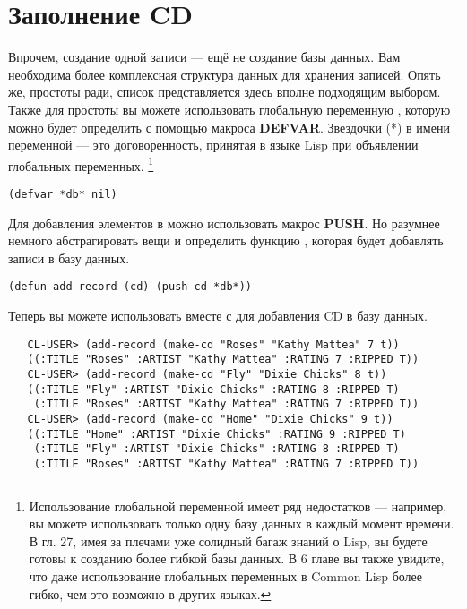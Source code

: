 \section{Заполнение CD}

Впрочем, создание одной записи --- ещё не создание базы данных. Вам необходима более
комплексная структура данных для хранения записей. Опять же, простоты ради, список
представляется здесь вполне подходящим выбором. Также для простоты вы можете использовать
глобальную переменную , которую можно будет определить с помощью макроса
\textbf{DEFVAR}. Звездочки (*) в имени переменной --- это договоренность, принятая в языке
Lisp при объявлении глобальных переменных. \footnote{Использование глобальной переменной
  имеет ряд недостатков --- например, вы можете использовать только одну базу данных в
  каждый момент времени. В гл. 27, имея за плечами уже солидный багаж знаний о Lisp, вы
  будете готовы к созданию более гибкой базы данных. В 6 главе вы также увидите, что даже
  использование глобальных переменных в Common Lisp более гибко, чем это возможно в других
  языках.}

\begin{lstlisting}
(defvar *db* nil)
\end{lstlisting}

Для добавления элементов в  можно использовать макрос \textbf{PUSH}. Но
разумнее немного абстрагировать вещи и определить функцию , которая будет
добавлять записи в базу данных.

\begin{lstlisting}
(defun add-record (cd) (push cd *db*))
\end{lstlisting}

Теперь вы можете использовать  вместе с  для добавления CD
в базу данных.

\begin{verbatim}
   CL-USER> (add-record (make-cd "Roses" "Kathy Mattea" 7 t))
   ((:TITLE "Roses" :ARTIST "Kathy Mattea" :RATING 7 :RIPPED T))
   CL-USER> (add-record (make-cd "Fly" "Dixie Chicks" 8 t))
   ((:TITLE "Fly" :ARTIST "Dixie Chicks" :RATING 8 :RIPPED T)
    (:TITLE "Roses" :ARTIST "Kathy Mattea" :RATING 7 :RIPPED T))
   CL-USER> (add-record (make-cd "Home" "Dixie Chicks" 9 t))
   ((:TITLE "Home" :ARTIST "Dixie Chicks" :RATING 9 :RIPPED T)
    (:TITLE "Fly" :ARTIST "Dixie Chicks" :RATING 8 :RIPPED T)
    (:TITLE "Roses" :ARTIST "Kathy Mattea" :RATING 7 :RIPPED T))
\end{verbatim}

